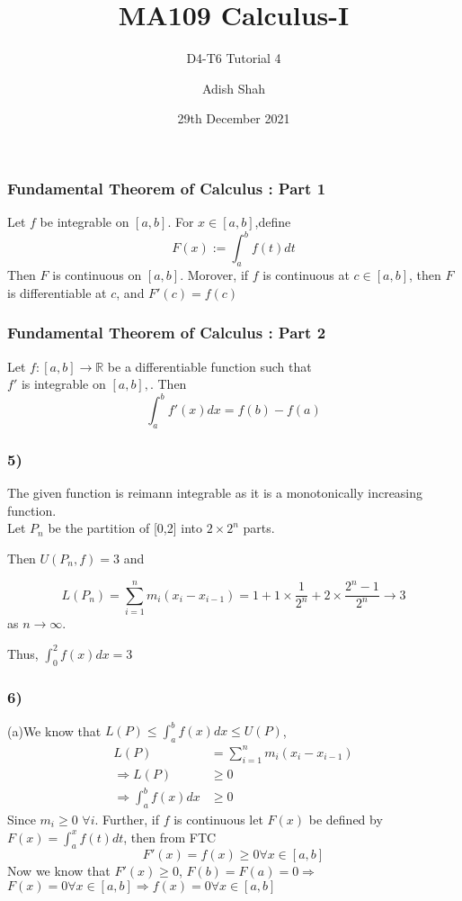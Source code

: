 \documentclass[handout]{beamer}
\title[MA109 Calculus-I] %
{MA109 Calculus-I}
\subtitle{D4-T6 Tutorial 4}
\author[Adish Shah] %
{Adish Shah}
\date[29th December 2021] %
{29th December 2021}
\begin{document}
\frame{\titlepage}

\begin{frame}
	\frametitle{{Fundamental Theorem of Calculus : Part 1}}
	\begin{theorem}
		Let $f$ be integrable on $[a, b]$. For $x \in [a,b]$,define\\
		\[F(x) := \int_{a}^{b}f(t)dt\] 
	Then $F$ is continuous on $[a,b]$. Morover, if $f$ is continuous at $c \in [a,b]$,
	then $F$ is differentiable at $c$, and $F'(c) = f(c)$
	\end{theorem}

\end{frame}
\begin{frame}
	\frametitle{{Fundamental Theorem of Calculus : Part 2}}
	\begin{theorem}
		Let $f:[a, b] \to \mathbb{R}$ be a differentiable function such that\\
		$f'$ is integrable on $[a, b],$. Then\\
		\[\int_{a}^{b}f'(x)dx = f(b)-f(a)\]
	\end{theorem}
\end{frame}

\begin{frame}
	\frametitle{5)}
	The given function is reimann integrable as it is a monotonically increasing function. \\
	Let $P_{n}$ be the partition of [0,2] into $2 \times 2^{n}$ parts.

	Then $U(P_{n},f) = 3$ and

	\[L(P_{n}) = \sum_{i=1}^{n} m_i(x_i-x_{i-1}) =  1 + 1 \times \frac{1}{2^{n}} + 2 \times \frac{2^{n}-1}{2^{n}} \rightarrow 3 \]
	as $n \rightarrow \infty$.

	Thus, $\int_{0}^{2}f(x)dx = 3$
\end{frame}

\begin{frame}
	\frametitle{6)}
	(a)We know that $L(P)\leq \int_{a}^{b}f(x)dx \leq U(P)$,
	\begin{align*}
		L(P)                           & =\sum_{i=1}^{n} m_i(x_i-x_{i-1}) \\
		\Rightarrow L(P)               & \geq 0                           \\
		\Rightarrow \int_{a}^{b}f(x)dx & \geq 0
	\end{align*}
	Since $m_i\geq 0$  $\forall i$. Further, if $f$ is continuous let $F(x)$ be defined by $F(x)=\int_{a}^{x}f(t)dt$, then from FTC
	$$F'(x)=f(x)\geq 0\forall x\in [a,b]$$
	Now we know that $F'(x)\geq 0$, $F(b)=F(a)=0\Rightarrow$ $F(x)=0\forall x\in[a,b]\Rightarrow f(x)=0\forall x\in[a,b]$
\end{frame}
\end{document}
